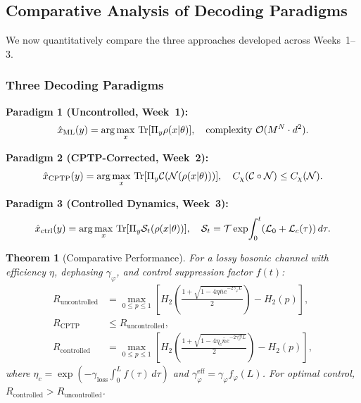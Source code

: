 \documentclass[12pt,a4paper]{article}
\theoremstyle{definition}
\theoremstyle{plain}
\newtheorem{theorem}{Theorem}[section]
\begin{document}
\subsection{Comparative Analysis of Decoding Paradigms}

We now quantitatively compare the three approaches developed across Weeks~1--3.

\subsubsection{Three Decoding Paradigms}

\noindent\textbf{Paradigm 1 (Uncontrolled, Week~1):}
\begin{equation}
\hat{x}_{\mathrm{ML}}(y)=\arg\max_x\,\Tr[\Pi_y\rho(x|\theta)],\quad\text{complexity }\mathcal{O}(M^N\cdot d^2).
\end{equation}

\noindent\textbf{Paradigm 2 (CPTP-Corrected, Week~2):}
\begin{equation}
\hat{x}_{\mathrm{CPTP}}(y)=\arg\max_x\,\Tr[\Pi_y\mathcal{C}(\mathcal{N}(\rho(x|\theta)))],\quad
C_\chi(\mathcal{C}\circ\mathcal{N})\le C_\chi(\mathcal{N}).
\end{equation}

\noindent\textbf{Paradigm 3 (Controlled Dynamics, Week~3):}
\begin{equation}
\hat{x}_{\mathrm{ctrl}}(y)=\arg\max_x\,\Tr[\Pi_y\mathcal{S}_t(\rho(x|\theta))],\quad
\mathcal{S}_t=\mathcal{T}\exp\!\int_0^t(\mathcal{L}_0+\mathcal{L}_c(\tau))\,d\tau.
\end{equation}

\begin{theorem}[Comparative Performance]
For a lossy bosonic channel with efficiency $\eta$, dephasing $\gamma_\varphi$, and
control suppression factor $f(t)$:
\begin{align}
R_{\mathrm{uncontrolled}} &=\max_{0\le p\le1}\!\left[H_2\!\left(\tfrac{1+\sqrt{1-4\eta\bar{n}e^{-2\gamma_\varphi L}}}{2}\right)-H_2(p)\right],\\
R_{\mathrm{CPTP}} &\le R_{\mathrm{uncontrolled}},\\
R_{\mathrm{controlled}} &=\max_{0\le p\le1}\!\left[H_2\!\left(\tfrac{1+\sqrt{1-4\eta_c\bar{n}e^{-2\gamma_\varphi^{\mathrm{eff}}L}}}{2}\right)-H_2(p)\right],
\end{align}
where $\eta_c=\exp(-\gamma_{\mathrm{loss}}\int_0^L f(\tau)\,d\tau)$ and $\gamma_\varphi^{\mathrm{eff}}=\gamma_\varphi f_\varphi(L)$.
For optimal control, $R_{\mathrm{controlled}}>R_{\mathrm{uncontrolled}}$.
\end{theorem}
\end{document}

